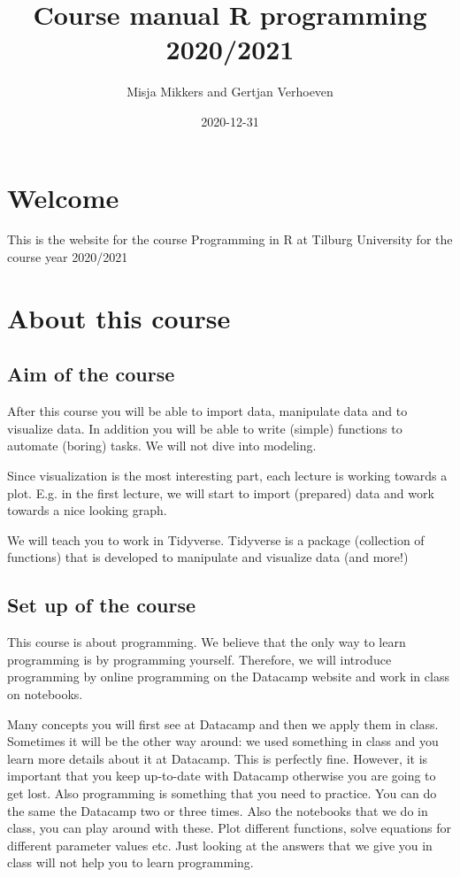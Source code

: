 \documentclass[
]{book}
\title{Course manual R programming 2020/2021}
\author{Misja Mikkers and Gertjan Verhoeven}
\date{2020-12-31}
\begin{document}
\maketitle

{
\setcounter{tocdepth}{1}
\tableofcontents
}
\hypertarget{welcome}{%
\chapter*{Welcome}\label{welcome}}

This is the website for the course Programming in R at Tilburg University for the course year 2020/2021

\hypertarget{about-this-course}{%
\chapter{About this course}\label{about-this-course}}

\hypertarget{aim-of-the-course}{%
\section{Aim of the course}\label{aim-of-the-course}}

After this course you will be able to import data, manipulate data and to visualize data. In addition you will be able to write (simple) functions to automate (boring) tasks. We will not dive into modeling.

Since visualization is the most interesting part, each lecture is working towards a plot. E.g. in the first lecture, we will start to import (prepared) data and work towards a nice looking graph.

We will teach you to work in Tidyverse. Tidyverse is a package (collection of functions) that is developed to manipulate and visualize data (and more!)

\hypertarget{set-up-of-the-course}{%
\section{Set up of the course}\label{set-up-of-the-course}}

This course is about programming. We believe that the only way to learn programming is by programming yourself. Therefore, we will introduce programming by online programming on the Datacamp website and work in class on notebooks.

Many concepts you will first see at Datacamp and then we apply them in class. Sometimes it will be the other way around: we used something in class and you learn more details about it at Datacamp. This is perfectly fine. However, it is important that you keep up-to-date with Datacamp otherwise you are going to get lost. Also programming is something that you need to practice. You can do the same the Datacamp two or three times. Also the notebooks that we do in class, you can play around with these. Plot different functions, solve equations for different parameter values etc. Just looking at the answers that we give you in class will not help you to learn programming.
\end{document}
